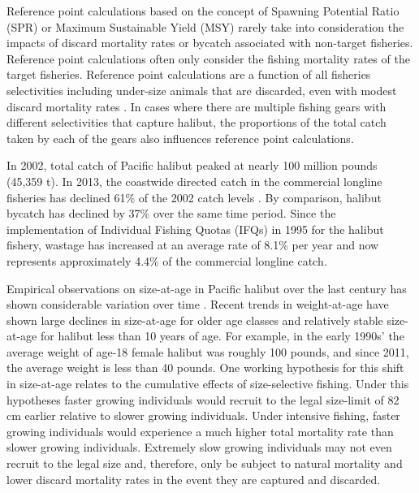 \documentclass[12pt,leqno]{article}
\begin{document}
Reference point calculations based on the concept of Spawning Potential Ratio (SPR) or Maximum Sustainable Yield (MSY) rarely take into consideration the impacts of discard mortality rates or bycatch associated with non-target fisheries.  Reference point calculations often only consider the fishing mortality rates of the target fisheries. Reference point calculations are a function of all fisheries selectivities including under-size animals that are discarded, even with modest discard mortality rates \citep{goodyear1993spawning,coggins2007ecm}.  In cases where there are multiple fishing gears with different selectivities that capture halibut, the proportions of the total catch taken by each of the gears also influences reference point calculations.

In 2002, total catch of Pacific halibut peaked at nearly 100 million pounds (45,359 t). In 2013, the coastwide directed catch in the commercial longline fisheries has declined  61\% of the 2002 catch levels \citep{stewartMartell2014}.  By comparison, halibut bycatch has declined by 37\% over the same time period.  Since the implementation of Individual Fishing Quotas (IFQs) in 1995 for the halibut fishery, wastage has increased at an average rate of 8.1\% per year and now represents approximately 4.4\% of the commercial longline catch.

Empirical observations on size-at-age in Pacific halibut over the last century has shown considerable variation over time \citep{Stewart2014}.  Recent trends in weight-at-age have shown large declines in size-at-age for older age classes and relatively stable size-at-age for halibut less than 10 years of age.  For example, in the early 1990s' the average weight of age-18 female halibut was roughly 100 pounds, and since 2011, the average weight is less than 40 pounds.  One working hypothesis for this shift in size-at-age relates to the cumulative effects of size-selective fishing.  Under this hypotheses faster growing individuals would recruit to the legal size-limit of 82 cm earlier relative to slower growing individuals.  Under intensive fishing, faster growing individuals would experience a much higher total mortality rate than slower growing individuals.  Extremely slow growing individuals may not even recruit to the legal size and, therefore, only be subject to natural mortality and lower discard mortality rates in the event they are captured and discarded.
\end{document}
